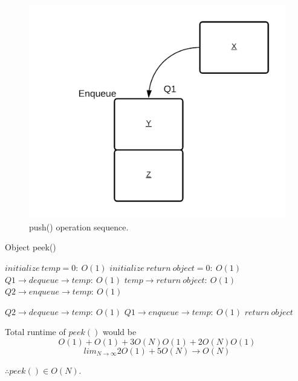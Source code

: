 \documentclass[journal]{IEEEtran}
\begin{document}
\begin{figure}[H]
    \includegraphics[scale = 0.17]{push.png}
    \caption{push() operation sequence.}
\end{figure}

\begin{algorithm}
    \caption{Object peek()}
    \begin{algorithmic}
        \STATE $initialize~temp = 0:~O(1)$
        \STATE $initialize~return~object = 0:~O(1)$
        \STATE $Q1 \rightarrow dequeue \rightarrow temp:~O(1)$
        \STATE $temp \rightarrow return~object:~O(1)$
        \ENDIF
        \STATE $Q2 \rightarrow enqueue \rightarrow temp:~O(1)$
        
        \ENDFOR
        \STATE $Q2 \rightarrow dequeue \rightarrow temp:~O(1)$
        \STATE $Q1 \rightarrow enqueue \rightarrow temp:~O(1)$
        \ENDFOR
        \RETURN $return~object$
    \end{algorithmic}
\end{algorithm}

Total runtime of $peek()$ would be 
$$O(1) + O(1) + 3O(N)O(1) + 2O(N)O(1)$$
$$lim_{N \rightarrow \infty}2O(1) + 5O(N) \rightarrow O(N)$$

$\therefore peek() \in \boxed{O(N)}$.
\end{document}
